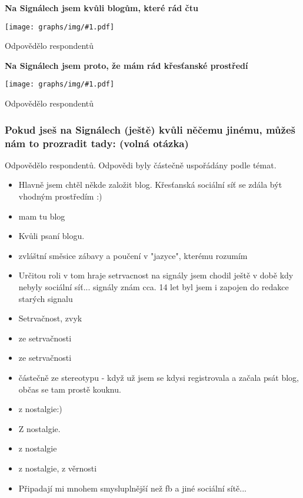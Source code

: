 \documentclass[12pt, a4paper, twoside]{article}
\newcommand{\answercount}[1]{Odpovědělo  respondentů}
\newcommand{\includegraph}[1]{
  \texttt{[image: graphs/img/\#1.pdf]}

  \answercount{#1}
}
\begin{document}
\textbf{Na Signálech jsem kvůli blogům, které rád čtu}

\includegraph{proc_signaly_oblibene_blogy}

\textbf{Na Signálech jsem proto, že mám rád křesťanské prostředí}

\includegraph{proc_signaly_krestanske_prostredi}

\subsubsection{Pokud jseš na Signálech (ještě) kvůli něčemu jinému, můžeš nám to prozradit tady: (volná otázka)}

\answercount{proc_signaly_jine}.
Odpovědi byly částečně uspořádány podle témat.

\begin{itemize}
\item Hlavně jsem chtěl někde založit blog. Křesťanská sociální síť se zdála být vhodným prostředím :)

\item mam tu blog

\item Kvůli psaní blogu.

\item zvláštní směsice zábavy  a poučení v "jazyce", kterému rozumím

\item Určitou roli v tom hraje setrvacnost na signály jsem chodil ještě v době kdy nebyly sociální síť... signály znám cca. 14 let byl jsem i zapojen do redakce starých signalu

\item Setrvačnost, zvyk

\item ze setrvačnosti

\item ze setrvačnosti

\item částečně ze stereotypu - když už jsem se kdysi registrovala a začala psát blog, občas se tam prostě kouknu.

\item z nostalgie:)

\item Z nostalgie.

\item z nostalgie

\item z nostalgie, z věrnosti

\item Připadají mi mnohem smysluplnější než fb a jiné sociální sítě...


\end{itemize}
\end{document}
